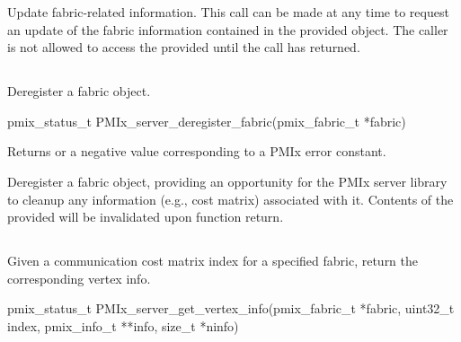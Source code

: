 \descr

Update fabric-related information. This call can be made at any time to request an update of the fabric information contained in the provided  object. The caller is not allowed to access the provided  until the call has returned.


\subsection{}

\summary

Deregister a fabric object.

\format

\cspecificstart
\begin{codepar}
pmix_status_t PMIx_server_deregister_fabric(pmix_fabric_t *fabric)
\end{codepar}
\cspecificend

\begin{arglist}
\end{arglist}

Returns  or a negative value corresponding to a \ac{PMIx} error constant.

\descr

Deregister a fabric object, providing an opportunity for the \ac{PMIx} server library to cleanup any information (e.g., cost matrix) associated with it. Contents of the provided  will be invalidated upon function return.


\subsection{}

\summary

Given a communication cost matrix index for a specified fabric, return the corresponding vertex info.

\format

\cspecificstart
\begin{codepar}
pmix_status_t
PMIx_server_get_vertex_info(pmix_fabric_t *fabric, uint32_t index,
                            pmix_info_t **info, size_t *ninfo)
\end{codepar}
\cspecificend

